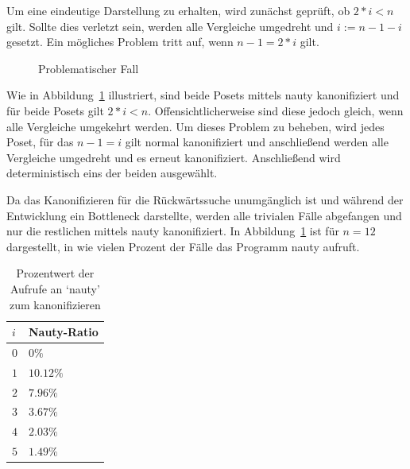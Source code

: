 \documentclass[10pt,journal,compsoc]{IEEEtran}
\begin{document}
Um eine eindeutige Darstellung zu erhalten, wird zunächst geprüft, ob $2 * i < n$ gilt.
Sollte dies verletzt sein, werden alle Vergleiche umgedreht und $i := n - 1 - i$ gesetzt.
Ein mögliches Problem tritt auf, wenn $n - 1 = 2 * i$ gilt.
\begin{figure}
  \centering
  \caption{Problematischer Fall}
  \label{fig:backward_canonify_problematic}
\end{figure}
Wie in Abbildung~\ref{fig:backward_canonify_problematic} illustriert, sind beide Posets mittels nauty kanonifiziert und für beide Posets gilt  $2 * i < n$.
Offensichtlicherweise sind diese jedoch gleich, wenn alle Vergleiche umgekehrt werden.
Um dieses Problem zu beheben, wird jedes Poset, für das $n - 1 = i$ gilt normal kanonifiziert und anschließend werden alle Vergleiche umgedreht und es erneut kanonifiziert.
Anschließend wird deterministisch eins der beiden ausgewählt.

Da das Kanonifizieren für die Rückwärtssuche unumgänglich ist und während der Entwicklung ein Bottleneck darstellte, werden alle trivialen Fälle abgefangen und nur die restlichen mittels nauty kanonifiziert.
In Abbildung~\ref{table:nauty-ratio} ist für $n = 12$ dargestellt, in wie vielen Prozent der Fälle das Programm nauty aufruft.

\begin{table}
  \begin{tabular}{l|l}
    $i$ & Nauty-Ratio \\ %
    \hline
    $0$ & $0\%$       \\
    $1$ & $10.12\%$   \\
    $2$ & $7.96\%$    \\
    $3$ & $3.67\%$    \\
    $4$ & $2.03\%$    \\
    $5$ & $1.49\%$
  \end{tabular}
  \centering
  \caption{Prozentwert der Aufrufe an `nauty' zum kanonifizieren}
  \label{table:nauty-ratio}
\end{table}
\end{document}
